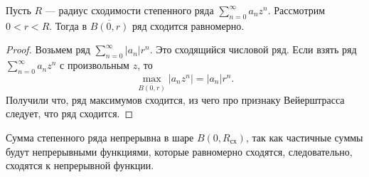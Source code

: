 \begin{thm}
	Пусть $ R$ --- радиус сходимости степенного ряда  $ \sum_{n=0}^{\infty} a_n z^{n}$. Рассмотрим $ 0 < r < R$. Тогда в $ \overline{B(0, r)}$ ряд сходится равномерно.
\end{thm}
\begin{proof}
    Возьмем ряд $ \sum_{n=0}^{\infty} \lvert a_n \rvert r^{n}$. Это сходящийся числовой ряд. Если взять ряд $ \sum_{n=0}^{\infty} a_n z^{n}$ с произвольным $ z$, то 
	\[
		\max_{\overline{B(0, r)}} \lvert a_n z^{n} \rvert = \lvert a_n \rvert r^{n}
	.\] 
	Получили что, ряд максимумов сходится, из чего про признаку Вейерштрасса следует, что ряд сходится.
\end{proof}
\begin{cor}
	Сумма степенного ряда непрерывна в шаре $ B(0, R_{\text{сх}})$, так как частичные суммы будут непрерывными функциями, которые равномерно сходятся, следовательно, сходятся к непрерывной функции. 
\end{cor}

